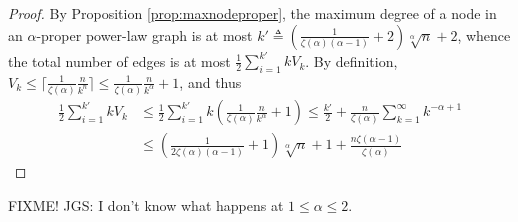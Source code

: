 \documentclass{article}
\theoremstyle{remark}
\begin{document}
\begin{proof}
By Proposition \ref{prop:maxnodeproper}, the maximum degree of a node in an $\alpha$-proper power-law
graph is at most $k' \triangleq \left(\frac{1}{\zeta(\alpha) (\alpha - 1)} + 2\right) \sqrt[\alpha]{n} + 2$, whence
the total number of edges is at most $\frac{1}{2}\sum_{i=1}^{k'} k V_k$. By definition,
$V_k \leq \lceil \frac{1}{\zeta(\alpha)}\frac{n}{k^n}\rceil \leq \frac{1}{\zeta(\alpha)} \frac{n}{k^{\alpha}} + 1$, and thus
\begin{align*}
\frac{1}{2}\sum_{i=1}^{k'} k V_k &\leq \frac{1}{2}\sum_{i=1}^{k'} k \left( \frac{1}{\zeta(\alpha)} \frac{n}{k^{\alpha}} + 1 \right)
 \leq \frac{k'}{2} + \frac{n}{\zeta(\alpha)} \sum_{k=1}^{\infty} k^{-\alpha+1} \\
&\leq \left(\frac{1}{2\zeta(\alpha) (\alpha - 1)} + 1\right) \sqrt[\alpha]{n} + 1 + \frac{n \zeta(\alpha - 1)}{\zeta(\alpha)} 
\end{align*}
\end{proof}

FIXME! JGS: I don't know what happens at $1 \leq \alpha \leq 2$.






\end{document}
